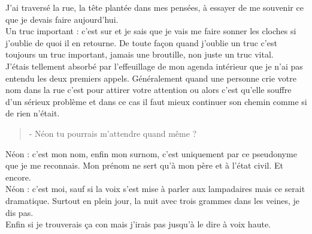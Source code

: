 J'ai traversé la rue, la tête plantée dans mes pensées, à essayer de me souvenir ce que je devais faire aujourd'hui. \\
Un truc important : c'est sur et je sais que je vais me faire sonner les cloches si j'oublie de quoi il en retourne. De toute façon quand j'oublie un truc c'est toujours un truc important, jamais une broutille, non juste un truc vital. \\

J'étais tellement absorbé par l’effeuillage de mon agenda intérieur que je n'ai pas entendu les deux premiers appels. Généralement quand une personne crie votre nom dans la rue c'est pour attirer votre attention ou alors c'est qu'elle souffre d'un sérieux problème et dans ce cas il faut mieux continuer son chemin comme si de rien n'était. \\

\begin{quote}
- Néon tu pourrais m'attendre quand même ? \\
\end{quote}

Néon : c'est mon nom, enfin mon surnom, c'est uniquement par ce pseudonyme que je me reconnais. Mon prénom ne sert qu'à mon père et à l'état civil. Et encore. \\
Néon : c'est moi, sauf si la voix s'est mise à parler aux lampadaires mais ce serait dramatique. Surtout en plein jour, la nuit avec trois grammes dans les veines, je dis pas. \\
Enfin si je trouverais ça con mais j'irais pas jusqu'à le dire à voix haute. \\